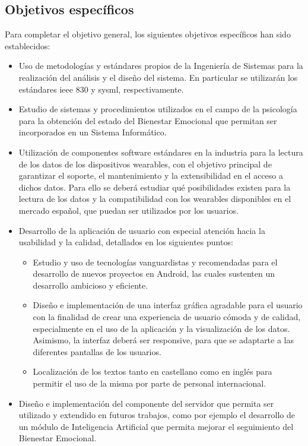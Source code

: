     \subsection{Objetivos específicos}
        Para completar el objetivo general, los siguientes objetivos específicos han sido establecidos:
        \begin{itemize}
            \item Uso de metodologías y estándares propios de la Ingeniería de Sistemas para la realización del análisis y el diseño del sistema. En particular se utilizarán los estándares \gls{ieee} 830 y \gls{sysml}, respectivamente.
            \item Estudio de sistemas y procedimientos utilizados en el campo de la psicología para la obtención del estado del Bienestar Emocional que permitan ser incorporados en un Sistema Informático.
            \item Utilización de componentes software estándares en la industria para la lectura de los datos de los dispositivos \glspl{wearable}, con el objetivo principal de garantizar el soporte, el mantenimiento y la extensibilidad en el acceso a dichos datos. Para ello se deberá estudiar qué posibilidades existen para la lectura de los datos y la compatibilidad con los \glspl{wearable} disponibles en el mercado español, que puedan ser utilizados por los usuarios.
            \item Desarrollo de la aplicación de usuario con especial atención hacia la usabilidad y la calidad, detallados en los siguientes puntos:
            \begin{itemize}
                \item Estudio y uso de tecnologías vanguardistas y recomendadas para el desarrollo de nuevos proyectos en Android, las cuales sustenten un desarrollo ambicioso y eficiente.
                \item Diseño e implementación de una interfaz gráfica agradable para el usuario con la finalidad de crear una experiencia de usuario cómoda y de calidad, especialmente en el uso de la aplicación y la visualización de los datos. Asimismo, la interfaz deberá ser \gls{responsive}, para que se adaptarte a las diferentes pantallas de los usuarios.
                \item Localización de los textos tanto en castellano como en inglés para permitir el uso de la misma por parte de personal internacional.
            \end{itemize}
            \item Diseño e implementación del componente del servidor que permita ser utilizado y extendido en futuros trabajos, como por ejemplo el desarrollo de un módulo de Inteligencia Artificial que permita mejorar el seguimiento del Bienestar Emocional.
        \end{itemize}


